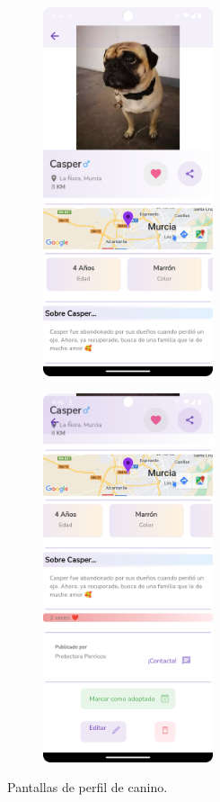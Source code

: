 \documentclass[a4paper, 12pt]{article}
\begin{document}
\begin{figure}[H]
   	\begin{subfigure}{0.48\textwidth}
		\begin{center}
			{\includegraphics[width=5cm]{app/DogProfile1.png}\par}
		\end{center}  
	\end{subfigure}\hfill
   	\begin{subfigure}{0.48\textwidth}
		\begin{center}
			{\includegraphics[width=5cm]{app/DogProfile2.png}\par}
		\end{center}  
	\end{subfigure}\hfill
	\caption{Pantallas de perfil de canino.}
\end{figure}
\end{document}
